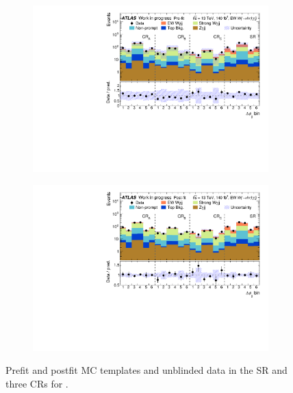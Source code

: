 
\begin{figure}[H]
\centering
\begin{subfigure}[b]{\textwidth}
    \centering
    \includegraphics[width=\textwidth]{plots/diffx/stacks/preFit_stack_jj_dphi_WIP_12Feb.pdf}
    \caption{}
\end{subfigure}
\hfill
\begin{subfigure}[b]{\textwidth}
    \centering
    \includegraphics[width=\textwidth]{plots/diffx/stacks/postFit_stack_jj_dphi_WIP_12Feb.pdf}
    \caption{}
\end{subfigure}
\caption{Prefit and postfit MC templates and unblinded data in the SR and three CRs for \jjdphi.}
\label{fig:jjdphi_templates}
\end{figure}

